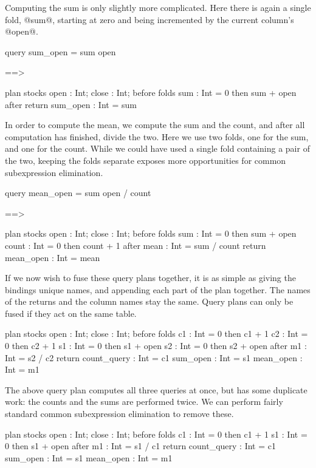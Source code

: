 Computing the sum is only slightly more complicated.
Here there is again a single fold, @sum@, starting at zero and being incremented by the current column's @open@.
\begin{code}
query sum_open = sum open


==>

plan stocks { open : Int; close : Int; }
before { }
folds  { sum : Int = 0 then sum + open }
after  { }
return { sum_open : Int = sum }
\end{code}

In order to compute the mean, we compute the sum and the count, and after all computation has finished, divide the two.
Here we use two folds, one for the sum, and one for the count.
While we could have used a single fold containing a pair of the two, keeping the folds separate exposes more opportunities for common subexpression elimination.
\begin{code}
query mean_open = sum open / count

==>

plan stocks { open : Int; close : Int; }
before { }
folds  { sum       : Int = 0 then sum + open 
         count     : Int = 0 then count + 1 }
after  { mean      : Int = sum / count }
return { mean_open : Int = mean }
\end{code}

If we now wish to fuse these query plans together, it is as simple as giving the bindings unique names, and appending each part of the plan together.
The names of the returns and the column names stay the same.
Query plans can only be fused if they act on the same table.
\begin{code}
plan stocks { open : Int; close : Int; }
before { }
folds  { c1 : Int = 0 then c1 + 1
         c2 : Int = 0 then c2 + 1
         s1 : Int = 0 then s1 + open 
         s2 : Int = 0 then s2 + open }
after  { m1 : Int = s2 / c2 }
return { count_query : Int = c1
         sum_open    : Int = s1
         mean_open   : Int = m1 }
\end{code}

The above query plan computes all three queries at once, but has some duplicate work: the counts and the sums are performed twice.
We can perform fairly standard common subexpression elimination to remove these.
\begin{code}
plan stocks { open : Int; close : Int; }
before { }
folds  { c1 : Int = 0 then c1 + 1
         s1 : Int = 0 then s1 + open }
after  { m1 : Int = s1 / c1 }
return { count_query : Int = c1
         sum_open    : Int = s1
         mean_open   : Int = m1 }
\end{code}

